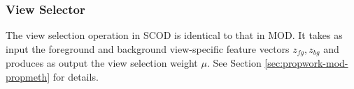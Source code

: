 \subsubsection{View Selector}
The view selection operation in SCOD is identical to that in MOD. It takes as input the foreground and background view-specific feature vectors $z_{fg}, z_{bg}$ and produces as output the view selection weight $\mu$. See Section \ref{sec:propwork-mod-propmeth} for details.

